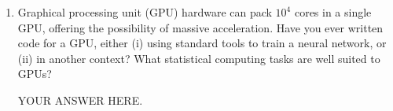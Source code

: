 \documentclass[12pt]{article}
\begin{document}
\begin{enumerate}
  YOUR ANSWER HERE.

\item Graphical processing unit (GPU) hardware can pack $10^4$ cores in a single GPU, offering the possibility of massive acceleration. Have you ever written code for a GPU, either (i) using standard tools to train a neural network, or (ii) in another context? What statistical computing tasks are well suited to GPUs?

  YOUR ANSWER HERE.

\end{enumerate}
\end{document}
